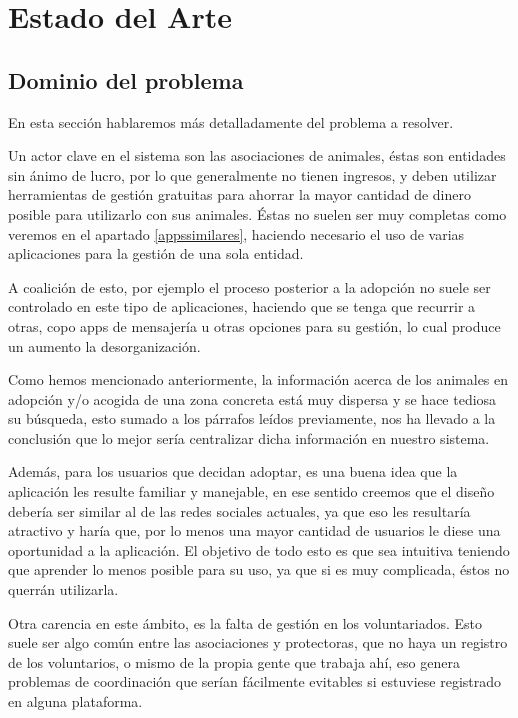 \chapter{Estado del Arte}

\section{Dominio del problema} \label{dompro}

En esta sección hablaremos más detalladamente del problema a resolver. 

Un actor clave en el sistema son las asociaciones de animales, éstas son entidades sin ánimo de lucro, por lo que generalmente no tienen ingresos, y deben utilizar herramientas de gestión gratuitas para ahorrar la mayor cantidad de dinero posible para utilizarlo con sus animales. Éstas no suelen ser muy completas como veremos en el apartado \ref{appssimilares}, haciendo necesario el uso de varias aplicaciones para la gestión de una sola entidad.

A coalición de esto, por ejemplo el proceso posterior a la adopción no suele ser controlado en este tipo de aplicaciones, haciendo que se tenga que recurrir a otras, copo apps de mensajería u otras opciones para su gestión, lo cual produce un aumento la desorganización.

Como hemos mencionado anteriormente, la información acerca de los animales en adopción y/o acogida de una zona concreta está muy dispersa y se hace tediosa su búsqueda, esto sumado a los párrafos leídos previamente, nos ha llevado a la conclusión que lo mejor sería centralizar dicha información en nuestro sistema.

Además, para los usuarios que decidan adoptar, es una buena idea que la aplicación les resulte familiar y manejable, en ese sentido creemos que el diseño debería ser similar al de las redes sociales actuales, ya que eso les resultaría atractivo y haría que, por lo menos una mayor cantidad de usuarios le diese una oportunidad a la aplicación. El objetivo de todo esto es que sea intuitiva teniendo que aprender lo menos posible para su uso, ya que si es muy complicada, éstos no querrán utilizarla.

Otra carencia en este ámbito, es la falta de gestión en los voluntariados. Esto suele ser algo común entre las asociaciones y protectoras, que no haya un registro de los voluntarios, o mismo de la propia gente que trabaja ahí, eso genera problemas de coordinación que serían fácilmente evitables si estuviese registrado en alguna plataforma.

